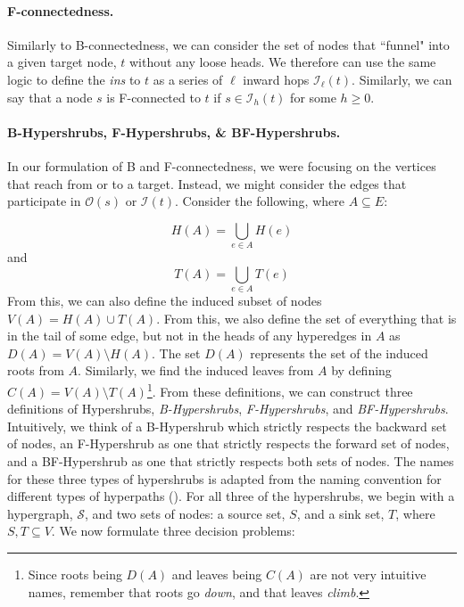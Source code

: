 \documentclass[12pt,twoside]{reedthesis}
\theoremstyle{definition}
\begin{document}
\paragraph{F-connectedness.}Similarly to B-connectedness, we can consider the set of nodes that ``funnel" into a given target node, $t$ without any loose heads. We therefore can use the same logic to define the \textit{ins} to $t$ as a series of $\ell$ inward hops $\mathcal{I}_\ell(t)$. Similarly, we can say that a node $s$ is F-connected to $t$ if $s \in \mathcal{I}_h(t)$ for some $h \geq 0$.

\paragraph{B-Hypershrubs, F-Hypershrubs, \& BF-Hypershrubs.}In our formulation of B and F-connectedness, we were focusing on the vertices that reach from or to a target. Instead, we might consider the edges that participate in $\mathcal{O}(s)$ or $\mathcal{I}(t)$. Consider the following, where $A \subseteq E$:

\begin{equation}
  H(A) = \bigcup_{e \in A} H(e)
\end{equation}
and
\begin{equation}
  T(A) = \bigcup_{e \in A} T(e)
\end{equation}
From this, we can also define the induced subset of nodes $V(A) = H(A) \cup T(A)$. From this, we also define the set of everything that is in the tail of some edge, but not in the heads of any hyperedges in $A$ as $D(A) = V(A) \setminus H(A)$. The set $D(A)$ represents the set of the induced roots from $A$. Similarly, we find the induced leaves from $A$ by defining $C(A) = V(A) \setminus T(A)$\footnote{Since roots being $D(A)$ and leaves being $C(A)$ are not very intuitive names, remember that roots go \textit{down}, and that leaves \textit{climb}.}. From these definitions, we can construct three definitions of Hypershrubs, \textit{B-Hypershrubs}, \textit{F-Hypershrubs}, and \textit{BF-Hypershrubs}. Intuitively, we think of a B-Hypershrub which strictly respects the backward set of nodes, an F-Hypershrub as one that strictly respects the forward set of nodes, and a BF-Hypershrub as one that strictly respects both sets of nodes. The names for these three types of hypershrubs is adapted from the naming convention for different types of hyperpaths (\cite{Gallo1993}). For all three of the hypershrubs, we begin with a hypergraph, $\mathcal{S}$, and two sets of nodes: a source set, $S$, and a sink set, $T$, where $S,T \subseteq V$. We now formulate three decision problems:\par
\end{document}
